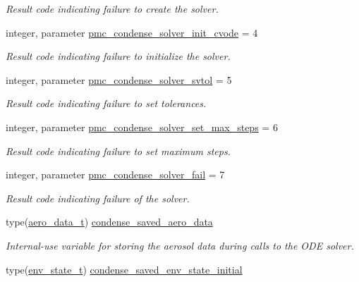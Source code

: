 \begin{DoxyCompactItemize}
\begin{DoxyCompactList}\small\item\em Result code indicating failure to create the solver. \end{DoxyCompactList}\item 
integer, parameter \mbox{\hyperlink{namespacepmc__condense_a152d39c4bae310586811b62dad524762}{pmc\+\_\+condense\+\_\+solver\+\_\+init\+\_\+cvode}} = 4
\begin{DoxyCompactList}\small\item\em Result code indicating failure to initialize the solver. \end{DoxyCompactList}\item 
integer, parameter \mbox{\hyperlink{namespacepmc__condense_a728628df918109b721d5ac51252ee397}{pmc\+\_\+condense\+\_\+solver\+\_\+svtol}} = 5
\begin{DoxyCompactList}\small\item\em Result code indicating failure to set tolerances. \end{DoxyCompactList}\item 
integer, parameter \mbox{\hyperlink{namespacepmc__condense_acf6e894f8461ba22f0e7b8d4b55bdbdb}{pmc\+\_\+condense\+\_\+solver\+\_\+set\+\_\+max\+\_\+steps}} = 6
\begin{DoxyCompactList}\small\item\em Result code indicating failure to set maximum steps. \end{DoxyCompactList}\item 
integer, parameter \mbox{\hyperlink{namespacepmc__condense_a72475de47c696e1ac0386f8f0881dba3}{pmc\+\_\+condense\+\_\+solver\+\_\+fail}} = 7
\begin{DoxyCompactList}\small\item\em Result code indicating failure of the solver. \end{DoxyCompactList}\item 
type(\mbox{\hyperlink{structpmc__aero__data_1_1aero__data__t}{aero\+\_\+data\+\_\+t}}) \mbox{\hyperlink{namespacepmc__condense_ae50824c600d52bf42b1ba4662d5ca40e}{condense\+\_\+saved\+\_\+aero\+\_\+data}}
\begin{DoxyCompactList}\small\item\em Internal-\/use variable for storing the aerosol data during calls to the O\+DE solver. \end{DoxyCompactList}\item 
type(\mbox{\hyperlink{structpmc__env__state_1_1env__state__t}{env\+\_\+state\+\_\+t}}) \mbox{\hyperlink{namespacepmc__condense_af55aca988067bd27f35a3c34e2f5a4cd}{condense\+\_\+saved\+\_\+env\+\_\+state\+\_\+initial}}

\end{DoxyCompactItemize}
